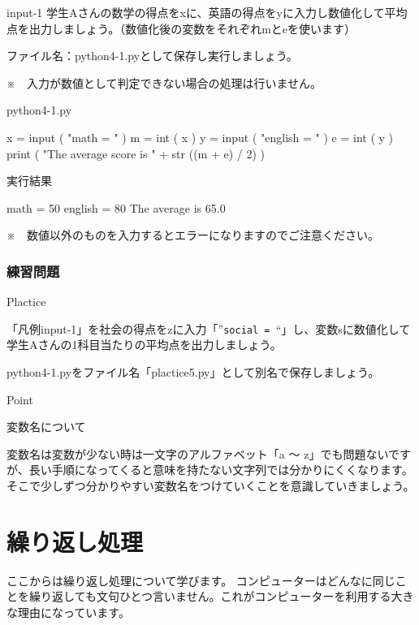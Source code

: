 \documentclass[11pt,a4paper,dvipdfmx,titlepage]{jsreport}
\begin{document}
\begin{pabox}{input-1}
学生Aさんの数学の得点をxに、英語の得点をyに入力し数値化して平均点を出力しましょう。（数値化後の変数をそれぞれmとeを使います）

ファイル名：python4-1.pyとして保存し実行しましょう。

※　入力が数値として判定できない場合の処理は行いません。
\begin{legbox}{python4-1.py}
\begin{listing}{1}
x = input ( "math = " )
m = int ( x ) 
y = input ( "english = " )
e = int ( y )
print ( "The average score is " + str ((m + e) / 2) )
\end{listing}
実行結果
\begin{listing}{1}
math = 50
english = 80
The average is 65.0
\end{listing}
\end{legbox}


※　数値以外のものを入力するとエラーになりますのでご注意ください。
\end{pabox}

\subsubsection{練習問題}
\begin{plabox}{Plactice}

「凡例input-1」を社会の得点をzに入力「”{\tt social = }“」し、変数sに数値化して学生Aさんの1科目当たりの平均点を出力しましょう。

python4-1.pyをファイル名「plactice5.py」として別名で保存しましょう。

\end{plabox}

\begin{hipoint}{Point}

変数名について

変数名は変数が少ない時は一文字のアルファベット「a ～ z」でも問題ないですが、長い手順になってくると意味を持たない文字列では分かりにくくなります。
そこで少しずつ分かりやすい変数名をつけていくことを意識していきましょう。
\end{hipoint}
\newpage
\section{繰り返し処理}
ここからは繰り返し処理について学びます。
コンピューターはどんなに同じことを繰り返しても文句ひとつ言いません。これがコンピューターを利用する大きな理由になっています。
\end{document}
